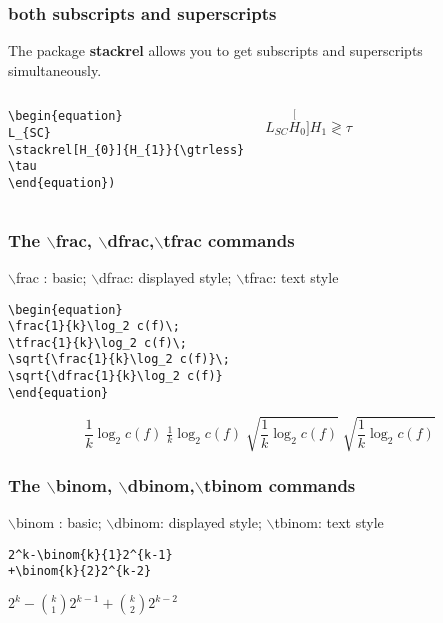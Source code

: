 \documentclass[12pt]{beamer}
\begin{document}
\begin{frame}[fragile]
\frametitle{both subscripts and superscripts}
The package \textbf{stackrel} allows you to get subscripts and superscripts simultaneously.
    \begin{columns}
        \begin{block}{}
        \begin{verbatim}
\begin{equation}
L_{SC}
\stackrel[H_{0}]{H_{1}}{\gtrless}
\tau
\end{equation})
        \end{verbatim}
        \end{block}
        \begin{block}{}
        \begin{equation}
            L_{SC}
            \stackrel[H_{0}]{H_{1}}{\gtrless}
            \tau
        \end{equation}
        \end{block}
    \end{columns}
\end{frame}
\begin{frame}[fragile]
\frametitle{The $\backslash$frac, $\backslash$dfrac,$\backslash$tfrac commands}
$\backslash$frac : basic; $\backslash$dfrac: displayed style; $\backslash$tfrac: text style
\begin{verbatim}
\begin{equation}
\frac{1}{k}\log_2 c(f)\;
\tfrac{1}{k}\log_2 c(f)\;
\sqrt{\frac{1}{k}\log_2 c(f)}\;
\sqrt{\dfrac{1}{k}\log_2 c(f)}
\end{equation}
\end{verbatim}

\begin{equation}
\frac{1}{k}\log_2 c(f)\;\tfrac{1}{k}\log_2 c(f)\;
\sqrt{\frac{1}{k}\log_2 c(f)}\;\sqrt{\dfrac{1}{k}\log_2 c(f)}
\end{equation}
\end{frame}

\begin{frame}[fragile]
\frametitle{The $\backslash$binom, $\backslash$dbinom,$\backslash$tbinom commands}
$\backslash$binom : basic; $\backslash$dbinom: displayed style; $\backslash$tbinom: text style
\begin{verbatim}
2^k-\binom{k}{1}2^{k-1}
+\binom{k}{2}2^{k-2}
\end{verbatim}

$2^k-\binom{k}{1}2^{k-1}+\binom{k}{2}2^{k-2}$
\end{frame}
\end{document}
